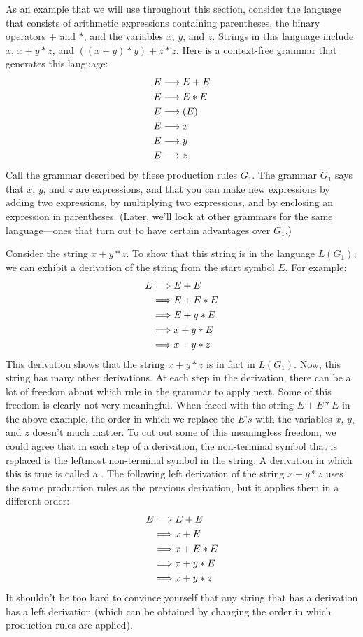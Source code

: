 As an example that we will use throughout
this section, consider the language that consists of arithmetic
expressions containing parentheses, the binary operators $+$ and $*$,
and the variables $x$, $y$, and $z$.  Strings in this language
include $x$, $x+y*z$, and $((x+y)*y)+z*z$.  Here is a context-free
grammar that generates this language:
\begin{align*}
   E&\longrightarrow E+E\\
   E&\longrightarrow E*E\\
   E&\longrightarrow (E)\\
   E&\longrightarrow x\\
   E&\longrightarrow y\\
   E&\longrightarrow z
\end{align*}
Call the grammar described by these production rules $G_1$.
The grammar $G_1$ says that $x$, $y$, and $z$ are expressions, and that
you can make new expressions by adding two expressions, by multiplying
two expressions, and by enclosing an expression in parentheses.
(Later, we'll look at other grammars for the same language---ones that
turn out to have certain advantages over $G_1$.)

Consider the string $x+y*z$.  To show that this string is in the
language $L(G_1)$, we can exhibit a derivation of the string
from the start symbol $E$.  For example:
\begin{align*}
   E &\Longrightarrow E+E\\
     &\Longrightarrow E+E*E\\
     &\Longrightarrow E+y*E\\
     &\Longrightarrow x+y*E\\
     &\Longrightarrow x+y*z
\end{align*}
This derivation shows that the string $x+y*z$ is in fact in $L(G_1)$.
Now, this string has many other derivations.  At each step in the
derivation, there can be a lot of freedom about which rule in the
grammar to apply next.  Some of this freedom is clearly not very
meaningful.  When faced with the string $E+E*E$ in the above example,
the order in which we replace the $E\text{'}s$ with the variables $x$, $y$,
and $z$ doesn't much matter.  To cut out some of this meaningless
freedom, we could agree that in each step of a derivation, the
non-terminal symbol that is replaced is the leftmost non-terminal
symbol in the string.  A derivation in which this is true is
called a .  The following left derivation
of the string $x+y*z$ uses the same production rules as the previous
derivation, but it applies them in a different order:
\begin{align*}
   E &\Longrightarrow E+E\\
     &\Longrightarrow x+E\\
     &\Longrightarrow x+E*E\\
     &\Longrightarrow x+y*E\\
     &\Longrightarrow x+y*z
\end{align*}
It shouldn't be too hard to convince yourself that any string that
has a derivation has a left derivation (which can be obtained
by changing the order in which production rules are applied).

